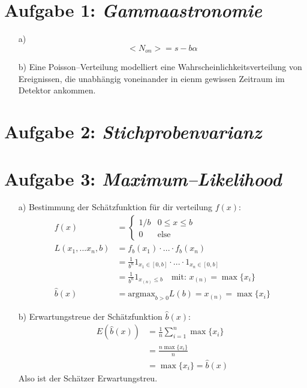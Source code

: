 \section*{Aufgabe 1: \emph{Gammaastronomie}}

\begin{itemize}
\item[a)] 
\begin{equation*}
<N_{on}> = s - b \alpha
\end{equation*}
\item[b)] Eine Poisson--Verteilung modelliert eine Wahrscheinlichkeitsverteilung von Ereignissen, die unabhängig voneinander in eienm gewissen Zeitraum im Detektor ankommen.
\end{itemize}



\section*{Aufgabe 2: \emph{Stichprobenvarianz}}

\section*{Aufgabe 3: \emph{Maximum--Likelihood}}
\begin{itemize}
\item[a)] Bestimmung der Schätzfunktion für dir verteilung $f(x)$:
\begin{align*}
f(x)&=
	\begin{cases}
		1/b & 0 \leq x \leq b\\
		0	&\text{else}
	\end{cases}\\
L(x_1 ,... x_n,b) &= f_b(x_1)\cdot ... \cdot f_b(x_n)\\
&=\frac{1}{b^n} 1_{x_1 \in [0,b]} \cdot ... \cdot 1_{x_n \in [0,b]}\\
&=\frac{1}{b^n} 1_{x_{(n)} \leq b} \quad \text{mit: } x_{(n)} = \max\{x_i\} \\
\hat{b}(x) &= \text{argmax}_{b>0} L(b) = x_{(n)} =  \max\{x_i\} 
\end{align*}
\item[b)] Erwartungstreue der Schätzfunktion $\hat{b}(x)$:
\begin{align*}
E(\hat{b}(x)) &= \frac{1}{n} \sum_{i=1}^n \max\{x_i\}\\ 
&= \frac{n \max\{x_i\}}{n} \\
&= \max\{x_i\} = \hat{b}(x)
\end{align*}
Also ist der Schätzer Erwartungstreu.

\end{itemize}

